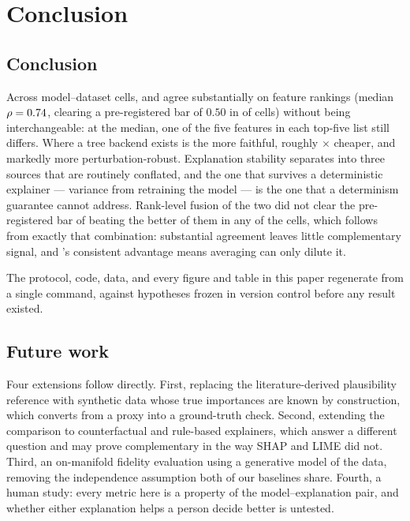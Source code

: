 \chapter{Conclusion}\label{ch:conclusion}

\section{Conclusion}\label{sec:conclusion}

Across \NumCells{} model--dataset cells, \shap{} and \lime{} agree substantially on
feature rankings (median $\rho = 0.74{}$, clearing a pre-registered bar of $0.50$
in \HOneRejected{} of \HOneTotal{} cells) without being interchangeable: at the median,
one of the five features in each top-five list still differs. Where a tree backend exists \shap{} is the more
faithful, roughly \SpeedFactor{}$\times$ cheaper, and markedly more perturbation-robust.
Explanation stability separates into three sources that are routinely conflated, and
the one that survives a deterministic explainer --- variance from retraining the model
--- is the one that a determinism guarantee cannot address. Rank-level fusion of the two did not clear the
pre-registered bar of beating the better of them in any of the \HSixTotal{} cells, which
follows from exactly that combination: substantial agreement leaves little complementary
signal, and \shap{}'s consistent advantage means averaging can only dilute it.

The protocol, code, data, and every figure and table in this paper regenerate from a
single command, against hypotheses frozen in version control before any result existed.

\section{Future work}
Four extensions follow directly. First, replacing the literature-derived plausibility
reference with synthetic data whose true importances are known by construction, which
converts  from a proxy into a ground-truth check. Second, extending the
comparison to counterfactual and rule-based explainers, which answer a different
question and may prove complementary in the way SHAP and LIME did not. Third, an
on-manifold fidelity evaluation using a generative model of the data, removing the
independence assumption both of our baselines share. Fourth, a human study: every metric
here is a property of the model--explanation pair, and whether either explanation helps
a person decide better is untested.
